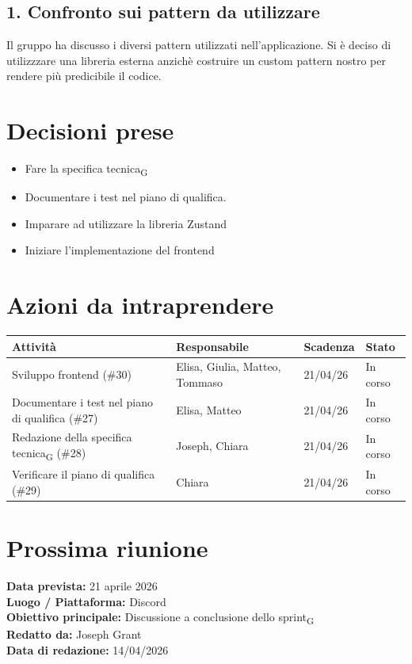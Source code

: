 \documentclass[a4paper,12pt]{article}
\newcommand{\gls}[1]{#1\textsubscript{G}}
\begin{document}
\subsection*{1. Confronto sui pattern da utilizzare}
Il gruppo ha discusso i diversi pattern utilizzati nell’applicazione. Si è deciso di utilizzzare una libreria esterna anzichè costruire un custom pattern nostro per rendere più predicibile il codice.


\section*{Decisioni prese}
\begin{itemize}
    \item Fare la \gls{specifica tecnica}
    \item Documentare i test nel piano di qualifica.
    \item Imparare ad utilizzare la libreria Zustand
    \item Iniziare l'implementazione del frontend
\end{itemize}

\section*{Azioni da intraprendere}
\begin{longtable}{|p{}|p{}|p{}|p{}|}
\hline
\textbf{Attività} & \textbf{Responsabile} & \textbf{Scadenza} & \textbf{Stato} \\ \hline
Sviluppo frontend (\#30) & Elisa, Giulia, Matteo, Tommaso & 21/04/26 & In corso \\ \hline
Documentare i test nel piano di qualifica (\#27) & Elisa, Matteo & 21/04/26 & In corso \\ \hline
Redazione della \gls{specifica tecnica} (\#28) & Joseph, Chiara & 21/04/26 & In corso \\ \hline
Verificare il piano di qualifica (\#29) & Chiara & 21/04/26 & In corso \\ \hline
\end{longtable}


\section*{Prossima riunione}
\textbf{Data prevista:} 21 aprile 2026\\
\textbf{Luogo / Piattaforma:} Discord \\
\textbf{Obiettivo principale:} Discussione a conclusione dello \gls{sprint}\\



\textbf{Redatto da:} Joseph Grant \\
\textbf{Data di redazione:} 14/04/2026
\end{document}
